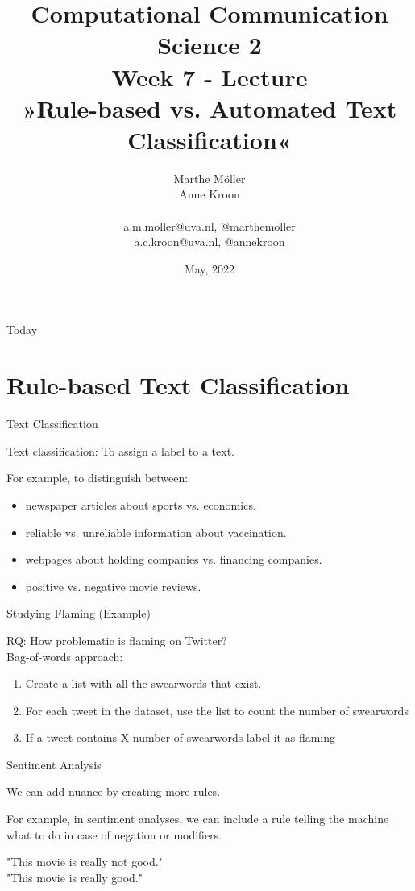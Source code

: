 \documentclass[handout]{beamer}
\title[Computational Communication Science 2]{\textbf{Computational Communication Science 2} \\Week 7 - Lecture\\ »Rule-based vs. Automated Text Classification«}
\author[Marthe Möller, Anne Kroon]{Marthe Möller \\ Anne Kroon \\ ~ \\ \footnotesize{a.m.moller@uva.nl, @marthemoller \\a.c.kroon@uva.nl, @annekroon} \\}
\date{May, 2022}
\institute[Digital Society Minor, University of Amsterdam]{Digital Society Minor, University of Amsterdam}
\begin{document}
	
	\begin{frame}{}
		\titlepage
	\end{frame}
	
	\begin{frame}{Today}
		\tableofcontents
	\end{frame}
	
	
	\section{Rule-based Text Classification}
	
	\begin{frame}{Text Classification} 
		
	Text classification: To assign a label to a text.
	
	For example, to distinguish between:
	\begin{itemize}
		\item newspaper articles about sports vs. economics.
		\item reliable vs. unreliable information about vaccination.
		\item webpages about holding companies vs. financing companies.
		\item positive vs. negative movie reviews.
	\end{itemize}
	
	\end{frame}
		
	\begin{frame}{Studying Flaming (Example)} 
	
	RQ: How problematic is flaming on Twitter? \\
	Bag-of-words approach:
	
	\begin{enumerate}
		\item Create a list with all the swearwords that exist.
		\item For each tweet in the dataset, use the list to count the number of swearwords	
		\item If a tweet contains X number of swearwords label it as flaming
	\end{enumerate}
	

\end{frame}


	\begin{frame}{Sentiment Analysis} 
	
	We can add nuance by creating more rules.
	
	For example, in sentiment analyses, we can include a rule telling the machine what to do in case of negation or modifiers.
	
	"This movie is really not good." \\
	"This movie is really good."
		
	\end{frame}
\end{document}
